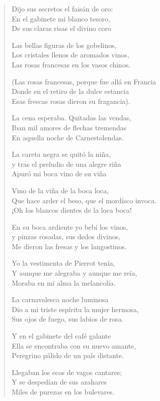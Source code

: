 \documentclass[12pt]{article}
\begin{document}
\clearpage
{}
\begin{verse}

Dijo sus secretos el faisán de oro:\\
En el gabinete mi blanco tesoro,\\
De sus claras risas el divino coro  

Las bellas figuras de los gobelinos,\\
Los cristales llenos de aromados vinos,\\
Las rosas francesas en los vasos chinos.  

(Las rosas francesas, porque fue allá en Francia\\
Donde en el retiro de la dulce estancia\\
Esas frescas rosas dieron su fragancia).  

La cena esperaba. Quitadas las vendas,\\
Iban mil amores de flechas tremendas\\
En aquella noche de Carnestolendas.  

La careta negra se quitó la niña,\\
y tras el preludio de una alegre riña\\
Apuró mi boca vino de su viña  

Vino de la viña de la boca loca,\\
Que hace arder el beso, que el mordisco invoca.\\
¡Oh los blancos dientes de la loca boca!  

En su boca ardiente yo bebí los vinos,\\
y pinzas rosadas, sus dedos divinos,\\
Me dieron las fresas y los langostinos.  

Yo la vestimenta de Pierrot tenía,\\
Y aunque me alegraba y aunque me reía,\\
Moraba en mi alma la melancolía.  

La carnavalesca noche luminosa\\
Dio a mi triste espíritu la mujer hermosa,\\
Sus ojos de fuego, sus labios de rosa.  

Y en el gabinete del café galante\\
Ella se encontraba con su nuevo amante,\\
Peregrino pálido de un país distante.  

Llegaban los ecos de vagos cantares;\\
Y se despedían de sus azahares\\
Miles de purezas en los bulevares.  


\end{verse}
\end{document}
